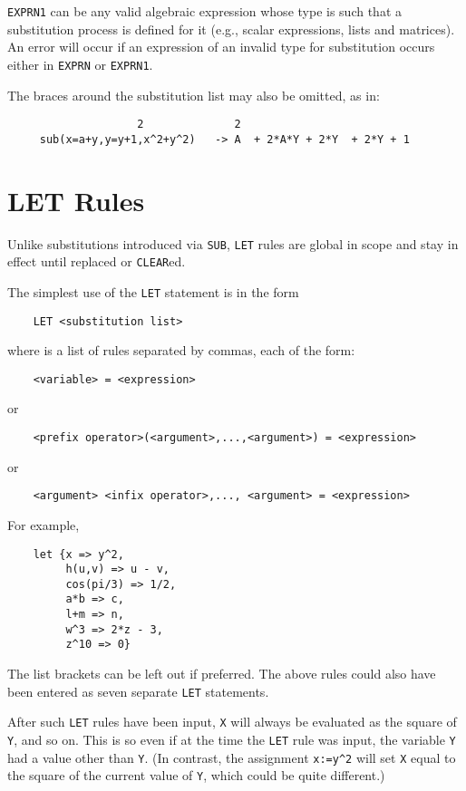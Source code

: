 {\tt EXPRN1} can be any valid algebraic expression whose type is such that
a substitution process is defined for it (e.g., scalar expressions, lists
and matrices).  An error will occur if an expression of an invalid type
for substitution occurs either in {\tt EXPRN} or {\tt EXPRN1}.

The braces around the substitution list may also be omitted, as in:

\begin{verbatim}
				    2              2
     sub(x=a+y,y=y+1,x^2+y^2)   -> A  + 2*A*Y + 2*Y  + 2*Y + 1
\end{verbatim}

\section{LET Rules}
\hypertarget{command:LET}{}
\hypertarget{reserved:impliesop}{}
Unlike substitutions introduced via {\tt SUB}, {\tt LET}
rules are global in scope and stay in effect until replaced or {\tt CLEAR}ed.

The simplest use of the {\tt LET} statement is in the form
\begin{verbatim}
	LET <substitution list>
\end{verbatim}
where {\tt <substitution list>} is a list of rules separated by commas, each
of the form:
\begin{verbatim}
	<variable> = <expression>
\end{verbatim}
or
\begin{verbatim}
    <prefix operator>(<argument>,...,<argument>) = <expression>
\end{verbatim}
or
\begin{verbatim}
    <argument> <infix operator>,..., <argument> = <expression>
\end{verbatim}
For example,
\begin{verbatim}
	let {x => y^2,
	     h(u,v) => u - v,
	     cos(pi/3) => 1/2,
	     a*b => c,
	     l+m => n,
	     w^3 => 2*z - 3,
	     z^10 => 0}
\end{verbatim}
The list brackets can be left out if preferred.  The above rules could
also have been entered as seven separate {\tt LET} statements.

After such {\tt LET} rules have been input, {\tt X} will always be
evaluated as the square of {\tt Y}, and so on.  This is so even if at the
time the {\tt LET} rule was input, the variable {\tt Y} had a value other
than {\tt Y}. (In contrast, the assignment {\tt x:=y\verb|^|2} will set {\tt X}
equal to the square of the current value of {\tt Y}, which could be quite
different.)

